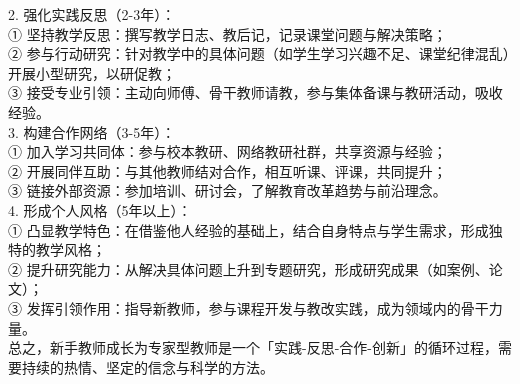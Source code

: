 \documentclass[12pt,a4paper]{article}
\begin{document}
2. 强化实践反思（2-3年）：\\
① 坚持教学反思：撰写教学日志、教后记，记录课堂问题与解决策略；\\
② 参与行动研究：针对教学中的具体问题（如学生学习兴趣不足、课堂纪律混乱）开展小型研究，以研促教；\\
③ 接受专业引领：主动向师傅、骨干教师请教，参与集体备课与教研活动，吸收经验。\\

3. 构建合作网络（3-5年）：\\
① 加入学习共同体：参与校本教研、网络教研社群，共享资源与经验；\\
② 开展同伴互助：与其他教师结对合作，相互听课、评课，共同提升；\\
③ 链接外部资源：参加培训、研讨会，了解教育改革趋势与前沿理念。\\

4. 形成个人风格（5年以上）：\\
① 凸显教学特色：在借鉴他人经验的基础上，结合自身特点与学生需求，形成独特的教学风格；\\
② 提升研究能力：从解决具体问题上升到专题研究，形成研究成果（如案例、论文）；\\
③ 发挥引领作用：指导新教师，参与课程开发与教改实践，成为领域内的骨干力量。\\

总之，新手教师成长为专家型教师是一个「实践-反思-合作-创新」的循环过程，需要持续的热情、坚定的信念与科学的方法。


\end{document}
